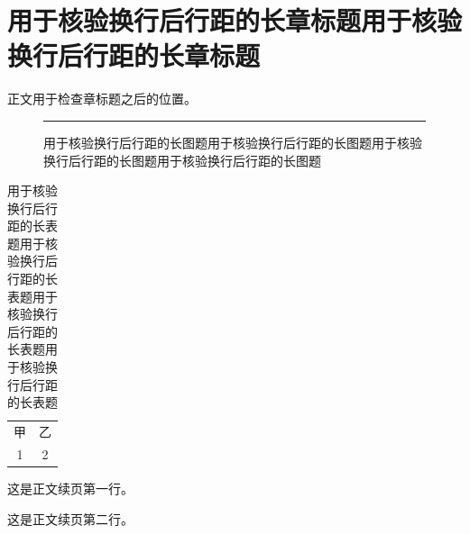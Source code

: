 \documentclass[degree=master,degreetype=academic]{tongjithesis}
\begin{document}
\mainmatter
\chapter{用于核验换行后行距的长章标题用于核验换行后行距的长章标题}
正文用于检查章标题之后的位置。
\begin{figure}[h]
\centering\rule{80mm}{15mm}
\caption{用于核验换行后行距的长图题用于核验换行后行距的长图题用于核验换行后行距的长图题用于核验换行后行距的长图题}
\end{figure}
\begin{table}[h]
\centering
\caption{用于核验换行后行距的长表题用于核验换行后行距的长表题用于核验换行后行距的长表题用于核验换行后行距的长表题}
\begin{tabular}{cc}甲&乙\\1&2\end{tabular}
\end{table}
\clearpage
这是正文续页第一行。\par
这是正文续页第二行。
\end{document}
